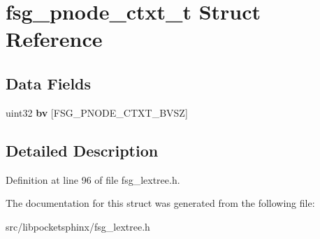 \section{fsg\-\_\-pnode\-\_\-ctxt\-\_\-t Struct Reference}
\label{structfsg__pnode__ctxt__t}
\subsection*{Data Fields}
\begin{DoxyCompactItemize}
\item 
uint32 {\bfseries bv} [F\-S\-G\-\_\-\-P\-N\-O\-D\-E\-\_\-\-C\-T\-X\-T\-\_\-\-B\-V\-S\-Z]\label{structfsg__pnode__ctxt__t_a5c6b0f2997dd312d73d710e2d86fcf71}

\end{DoxyCompactItemize}


\subsection{Detailed Description}


Definition at line 96 of file fsg\-\_\-lextree.\-h.



The documentation for this struct was generated from the following file\-:\begin{DoxyCompactItemize}
\item 
src/libpocketsphinx/fsg\-\_\-lextree.\-h\end{DoxyCompactItemize}
